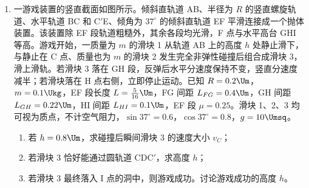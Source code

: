 \documentclass[\gkver]{gaokaozhenti}
\begin{document}
\begin{enumerate}
{其中 $V_{1} = 1 \times 10^{3} \Ucmc$，$T_{1} = 300 \UK$，$T_{2} = 303 \UK$

解得 $V_{2} = 1.01 \times 10^{3} \Ucmc$

此时气体压强为 $p_{2} = p_{1} = p_{0} + \rho gh = 1.01 \times 10^{5} \UPa$

气体从状态 2 到状态 3 的过程，由玻意耳定律

$p_{2}V_{2} = p_{3}V_{3}$

其中 $p_{3} = p_{0}$

代入数据解得，气体在状态 3 的体积为

$V_{3} = 1.0201 \times 10^{3} \Ucmc$

（3）气体从状态 1 到状态 2 的过程中，气体对外做功为

$W_{1} = p_{1}(V_{2} - V_{1}) = 1.01 \UJ$

由热力学第一定律

$\Delta U = Q - (W_{1} + W_{2})$

其中 $Q = 4.56 \UJ$，$W_{2} = 1.02 \UJ$

代入解得，从状态 1 到状态 3 气体内能的改变量为 $\Delta U = 2.53 \UJ$
}

\item
一游戏装置的竖直截面如图所示。倾斜直轨道 AB、半径为 $R$ 的竖直螺旋轨道、水平轨道 BC 和 C$'$E、倾角为 $37^{\circ}$ 的倾斜直轨道 EF 平滑连接成一个抛体装置。该装置除 EF 段轨道粗糙外，其余各段均光滑，F 点与水平高台 GHI 等高。游戏开始，一质量为 $m$ 的滑块 1 从轨道 AB 上的高度 $h$ 处静止滑下，与静止在 C 点、质量也为 $m$ 的滑块 2 发生完全非弹性碰撞后组合成滑块 3，滑上滑轨。若滑块 3 落在 GH 段，反弹后水平分速度保持不变，竖直分速度减半；若滑块落在 H 点右侧，立即停止运动。已知 $R = 0.2 \Um$，$m = 0.1 \Ukg$，EF 段长度 $L = \frac{5}{16} \Um$，FG 间距 $L_{FG} = 0.4 \Um$，GH 间距 $L_{GH} = 0.22 \Um$，HI 间距 $L_{HI} = 0.1 \Um$，EF 段 $\mu = 0.25$。滑块 1、2、3 均可视为质点，不计空气阻力，$\sin37^{\circ} = 0.6$，$\cos37^{\circ} = 0.8$，$g = 10 \Umsq$。

\begin{enumerate}
\item
若 $h = 0.8 \Um$，求碰撞后瞬间滑块 3 的速度大小 $v_{C}$；

\item
若滑块 3 恰好能通过圆轨道 CDC$'$，求高度 $h$；

\item
若滑块 3 最终落入 I 点的洞中，则游戏成功。讨论游戏成功的高度 $h$。
\end{enumerate}


\end{enumerate}
\end{document}
